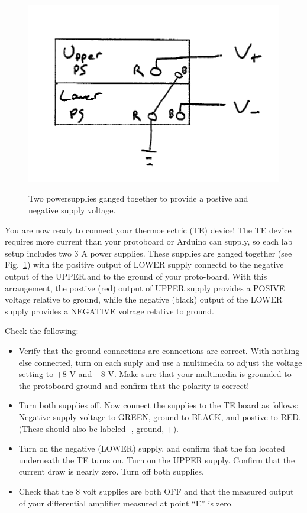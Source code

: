 \documentclass[12pt]{article}
\begin{document}
\begin{figure}[htb]
\begin{center}
{\includegraphics[height=0.30\textheight]{figs/racks.png}}  
\end{center}
\caption{\label{fig:crates} Two powersupplies ganged together to provide a postive and negative supply voltage.}
\end{figure}

You are now ready to connect your thermoelectric (TE) device! 
The TE device requires more current than your protoboard or Arduino can supply,
so each lab setup includes two 3 A power supplies.  These supplies are ganged
together (see Fig.~\ref{fig:crates}) with the positive output of LOWER supply
connectd to the negative output of the UPPER,and to the ground of your
proto-board.  With this arrangement, the postive (red) output of UPPER supply
provides a POSIVE voltage relative to ground, while the negative (black) output
of the LOWER supply provides a NEGATIVE volrage relative to ground.

Check the following:

\begin{itemize}
\item Verify that the ground connections are connections are correct.  With
nothing else connected, turn on each suply and use a multimedia to adjust the
voltage setting to $+8$ V and $-8$ V.  Make sure that your multimedia is
grounded to the protoboard ground and confirm that the polarity is correct!

\item Turn both supplies off.  Now connect the supplies to the TE board as
follows: Negative supply voltage to GREEN, ground to BLACK, and postive to RED.
(These should also be labeled -, ground, +).

\item Turn on the negative (LOWER) supply, and confirm that the fan located underneath
the TE turns on.  Turn on the UPPER supply.  Confirm that the current draw is
nearly zero.  Turn off both supplies.

\item Check that the 8 volt supplies are both OFF and that the measured output
  of your differential amplifier measured at point ``E'' is zero.

\end{itemize}
\end{document}

